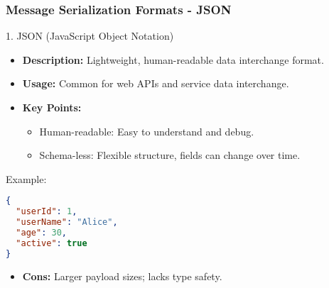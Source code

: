 \documentclass[aspectratio=169]{beamer}
\begin{document}
\begin{frame}[fragile]
    \frametitle{Message Serialization Formats - JSON}
    \begin{block}{1. JSON (JavaScript Object Notation)}
        \begin{itemize}
            \item \textbf{Description:} Lightweight, human-readable data interchange format.
            \item \textbf{Usage:} Common for web APIs and service data interchange.
        \end{itemize}
        
        \begin{itemize}
            \item \textbf{Key Points:}
            \begin{itemize}
                \item Human-readable: Easy to understand and debug.
                \item Schema-less: Flexible structure, fields can change over time.
            \end{itemize}
        \end{itemize}
        
        \begin{block}{Example:}
            \begin{lstlisting}[language=json]
{
  "userId": 1,
  "userName": "Alice",
  "age": 30,
  "active": true
}
            \end{lstlisting}
        \end{block}
        
        \begin{itemize}
            \item \textbf{Cons:} Larger payload sizes; lacks type safety.
        \end{itemize}
    \end{block}
\end{frame}
\end{document}
